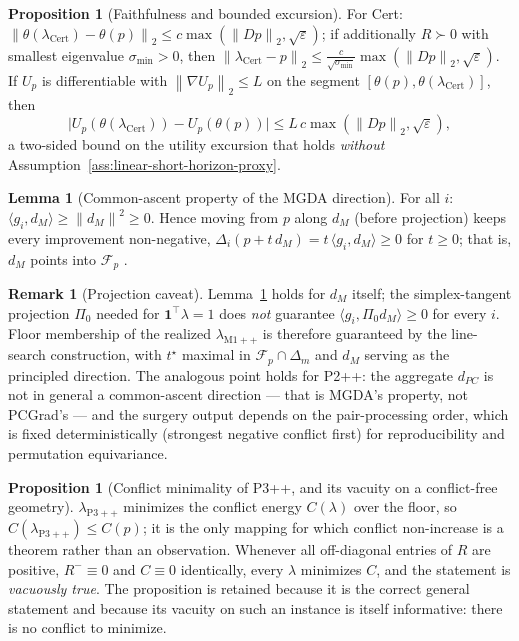 \documentclass[12pt,a4paper]{report}
\newcommand{\1}{\mathbf{1}}
\newcommand{\norm}[1]{\left\lVert #1 \right\rVert}
\newcommand{\Floor}{\mathcal{F}_{p}}
\newcommand{\Pz}{\Pi_{0}}
\theoremstyle{definition}
\newtheorem{remark}[definition]{Remark}
\newtheorem{proposition}[definition]{Proposition}
\newtheorem{lemma}[definition]{Lemma}
\begin{document}
\begin{proposition}[Faithfulness and bounded excursion]
\label{prop:faithfulness}
For Cert: \(\norm{\theta(\lambda_{\mathrm{Cert}})-\theta(p)}_2\le c\max(\norm{Dp}_2,\sqrt{\varepsilon})\); if additionally \(R\succ0\) with smallest eigenvalue \(\sigma_{\min}>0\), then \(\norm{\lambda_{\mathrm{Cert}}-p}_2\le\tfrac{c}{\sqrt{\sigma_{\min}}}\max(\norm{Dp}_2,\sqrt{\varepsilon})\). If \(U_p\) is differentiable with \(\norm{\nabla U_p}_2\le L\) on the segment \([\theta(p),\theta(\lambda_{\mathrm{Cert}})]\), then
\[
\bigl\lvert U_p(\theta(\lambda_{\mathrm{Cert}}))-U_p(\theta(p))\bigr\rvert\le L\,c\max(\norm{Dp}_2,\sqrt{\varepsilon}),
\]
a two-sided bound on the utility excursion that holds \emph{without} Assumption~\ref{ass:linear-short-horizon-proxy}.
\end{proposition}

\begin{lemma}[Common-ascent property of the MGDA direction]
\label{lem:mgda-ascent}
For all \(i\): \(\langle g_i,d_M\rangle\ge\norm{d_M}^2\ge0\). Hence moving from \(p\) along \(d_M\) (before projection) keeps every improvement non-negative, \(\Delta_i(p+t\,d_M)=t\,\langle g_i,d_M\rangle\ge0\) for \(t\ge0\); that is, \(d_M\) points into \(\Floor\) \citep{sener2018mgda}.
\end{lemma}

\begin{remark}[Projection caveat]
\label{rem:projection-caveat}
Lemma~\ref{lem:mgda-ascent} holds for \(d_M\) itself; the simplex-tangent projection \(\Pz\) needed for \(\1^\top\lambda=1\) does \emph{not} guarantee \(\langle g_i,\Pz d_M\rangle\ge0\) for every \(i\). Floor membership of the realized \(\lambda_{\mathrm{M1++}}\) is therefore guaranteed by the line-search construction, with \(t^\star\) maximal in \(\Floor\cap\Delta_m\) and \(d_M\) serving as the principled direction. The analogous point holds for P2++: the aggregate \(d_{PC}\) is not in general a common-ascent direction --- that is MGDA's property, not PCGrad's \citep{yu2020pcgrad} --- and the surgery output depends on the pair-processing order, which is fixed deterministically (strongest negative conflict first) for reproducibility and permutation equivariance.
\end{remark}

\begin{proposition}[Conflict minimality of P3++, and its vacuity on a conflict-free geometry]
\label{prop:conflict-minimality}
\(\lambda_{\mathrm{P3++}}\) minimizes the conflict energy \(C(\lambda)\) over the floor, so \(C(\lambda_{\mathrm{P3++}})\le C(p)\); it is the only mapping for which conflict non-increase is a theorem rather than an observation. Whenever all off-diagonal entries of \(R\) are positive, \(R^-\equiv0\) and \(C\equiv0\) identically, every \(\lambda\) minimizes \(C\), and the statement is \emph{vacuously true}. The proposition is retained because it is the correct general statement and because its vacuity on such an instance is itself informative: there is no conflict to minimize.
\end{proposition}
\end{document}
